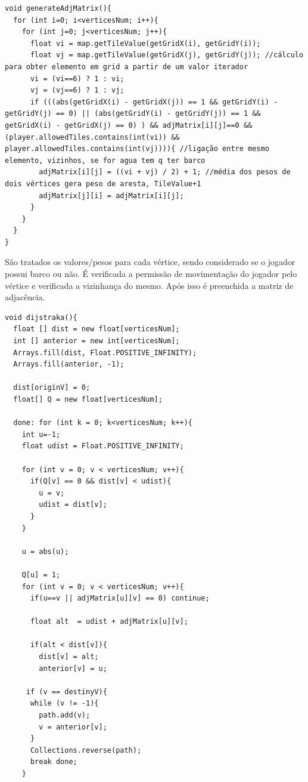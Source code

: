 \documentclass[
	12pt,				%
	oneside,			%
	a4paper,			%
	english,			%
	brazil,				%
	]{abntex2}
\begin{document}
{\begin{lstlisting}
void generateAdjMatrix(){    
  for (int i=0; i<verticesNum; i++){
    for (int j=0; j<verticesNum; j++){
      float vi = map.getTileValue(getGridX(i), getGridY(i));
      float vj = map.getTileValue(getGridX(j), getGridY(j)); //cálculo para obter elemento em grid a partir de um valor iterador
      vi = (vi==6) ? 1 : vi;
      vj = (vj==6) ? 1 : vj;
      if (((abs(getGridX(i) - getGridX(j)) == 1 && getGridY(i) - getGridY(j) == 0) || (abs(getGridY(i) - getGridY(j)) == 1 && getGridX(i) - getGridX(j) == 0) ) && adjMatrix[i][j]==0 && (player.allowedTiles.contains(int(vi)) && player.allowedTiles.contains(int(vj)))){ //ligação entre mesmo elemento, vizinhos, se for agua tem q ter barco
        adjMatrix[i][j] = ((vi + vj) / 2) + 1; //média dos pesos de dois vértices gera peso de aresta, TileValue+1
        adjMatrix[j][i] = adjMatrix[i][j];        
      }
    }
  }
}
\end{lstlisting}

São tratados os valores/pesos para cada vértice, sendo considerado se o jogador possui barco ou não. É verificada a permissão de movimentação do jogador pelo vértice e verificada a vizinhança do mesmo. Após isso é preenchida a matriz de adjacência.


\begin{lstlisting}
void dijstraka(){
  float [] dist = new float[verticesNum];
  int [] anterior = new int[verticesNum]; 
  Arrays.fill(dist, Float.POSITIVE_INFINITY); 
  Arrays.fill(anterior, -1);

  dist[originV] = 0;
  float[] Q = new float[verticesNum];
  
  done: for (int k = 0; k<verticesNum; k++){
    int u=-1;
    float udist = Float.POSITIVE_INFINITY;
    
    for (int v = 0; v < verticesNum; v++){
      if(Q[v] == 0 && dist[v] < udist){
        u = v;
        udist = dist[v];
      }
    }
    
    u = abs(u);
    
    Q[u] = 1;
    for (int v = 0; v < verticesNum; v++){
      if(u==v || adjMatrix[u][v] == 0) continue;
      
      float alt  = udist + adjMatrix[u][v];
      
      if(alt < dist[v]){
        dist[v] = alt;
        anterior[v] = u;
        
     if (v == destinyV){
      while (v != -1){
        path.add(v);
        v = anterior[v];
      }
      Collections.reverse(path);
      break done;
    } 
        

\end{lstlisting}}
\end{document}
